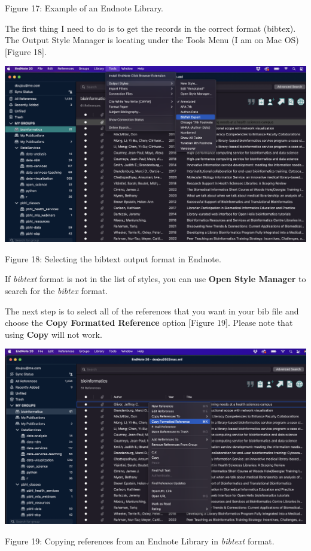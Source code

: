 \documentclass[
]{article}
\begin{document}
Figure 17: Example of an Endnote Library.

The first thing I need to do is to get the records in the correct format
(bibtex). The Output Style Manager is locating under the Tools Menu (I
am on Mac OS) {[}Figure 18{]}.

\includegraphics[width=6.5in,height=\textheight]{images/bib-02.png}

Figure 18: Selecting the bibtext output format in Endnote.

If \emph{bibtext} format is not in the list of styles, you can use
\textbf{Open Style Manager} to search for the \emph{bibtex} format.

The next step is to select all of the references that you want in your
bib file and choose the \textbf{Copy Formatted Reference} option
{[}Figure 19{]}. Please note that using \textbf{Copy} will not work.

\includegraphics[width=6.6875in,height=\textheight]{images/bib-03.png}

Figure 19: Copying references from an Endnote Library in \emph{bibtext}
format.
\end{document}
